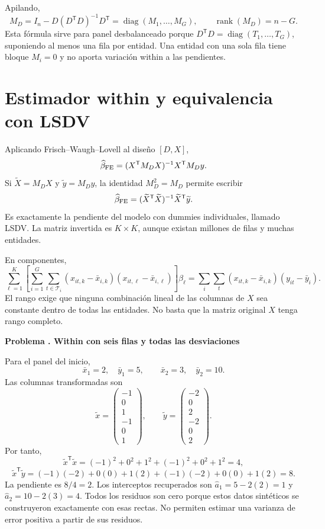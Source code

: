 \documentclass[11pt,a4paper]{article}
\newcommand{\T}{^{\mathsf T}}
\DeclareMathOperator{\rank}{rank}
\DeclareMathOperator{\diag}{diag}
\theoremstyle{definition}
\newcounter{problema}
\newenvironment{resuelto}[1]{\refstepcounter{problema}\par\medskip\Needspace{6\baselineskip}\textbf{Problema \theproblema. #1}\par}{\par\medskip}
\begin{document}
Apilando,
\[
M_D=I_n-D(D\T D)^{-1}D\T
=\diag(M_1,\ldots,M_G),\qquad \rank(M_D)=n-G.
\]
Esta fórmula sirve para panel desbalanceado porque $D\T D=\diag(T_1,\ldots,T_G)$, suponiendo al menos una fila por entidad. Una entidad con una sola fila tiene bloque $M_i=0$ y no aporta variación within a las pendientes.

\section{Estimador within y equivalencia con LSDV}
Aplicando Frisch--Waugh--Lovell al diseño $[D,X]$,
\[
\widehat\beta_{\rm FE}
=(X\T M_DX)^{-1}X\T M_Dy.
\]
Si $\widetilde X=M_DX$ y $\widetilde y=M_Dy$, la identidad $M_D^2=M_D$ permite escribir
\[
\widehat\beta_{\rm FE}
=(\widetilde X\T\widetilde X)^{-1}\widetilde X\T\widetilde y.
\]
Es exactamente la pendiente del modelo con dummies individuales, llamado LSDV. La matriz invertida es $K\times K$, aunque existan millones de filas y muchas entidades.

En componentes,
\[
\sum_{\ell=1}^K
\left[
\sum_{i=1}^G\sum_{t\in\mathcal T_i}
(x_{it,k}-\bar x_{i,k})(x_{it,\ell}-\bar x_{i,\ell})
\right]\widehat\beta_\ell
=\sum_i\sum_t(x_{it,k}-\bar x_{i,k})(y_{it}-\bar y_i).
\]
El rango exige que ninguna combinación lineal de las columnas de $X$ sea constante dentro de todas las entidades. No basta que la matriz original $X$ tenga rango completo.

\begin{resuelto}{Within con seis filas y todas las desviaciones}
Para el panel del inicio,
\[
\bar x_1=2,\quad\bar y_1=5,\qquad
\bar x_2=3,\quad\bar y_2=10.
\]
Las columnas transformadas son
\[
\widetilde x=\begin{pmatrix}-1\\0\\1\\-1\\0\\1\end{pmatrix},
\qquad
\widetilde y=\begin{pmatrix}-2\\0\\2\\-2\\0\\2\end{pmatrix}.
\]
Por tanto,
\[
\widetilde x\T\widetilde x
=(-1)^2+0^2+1^2+(-1)^2+0^2+1^2=4,
\]
\[
\widetilde x\T\widetilde y
=(-1)(-2)+0(0)+1(2)+(-1)(-2)+0(0)+1(2)=8.
\]
La pendiente es $8/4=2$. Los interceptos recuperados son
$\widehat a_1=5-2(2)=1$ y $\widehat a_2=10-2(3)=4$.
Todos los residuos son cero porque estos datos sintéticos se construyeron exactamente con esas rectas. No permiten estimar una varianza de error positiva a partir de sus residuos.
\end{resuelto}
\end{document}
